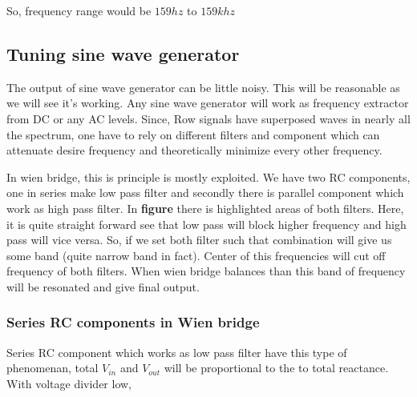 \documentclass[14pt,a4paper]{extarticle}
\begin{document}
So, frequency range would be \(159 hz\) to \(159k hz\)

\subsection{Tuning sine wave generator}
\label{sec:org46e8748}

The output of sine wave generator can be little noisy. This will be reasonable as we will see it's working. Any sine wave generator will work as frequency extractor from DC or any AC levels. Since, Row signals have superposed waves in nearly all the spectrum, one have to rely on different filters and component which can attenuate desire frequency and theoretically minimize every other frequency. 


In wien bridge, this is principle is mostly exploited. We have two RC components, one in series make low pass filter and secondly there is parallel component which work as high pass filter. In \textbf{\textbf{figure}} there is highlighted areas of both filters. Here, it is quite straight forward see that low pass will block higher frequency and high pass will vice versa. So, if we set both filter such that combination will give us some band (quite narrow band in fact). Center of this frequencies will cut off frequency of both filters. When wien bridge balances than this band of frequency will be resonated and give final output.

\subsubsection{Series RC components in Wien bridge}
\label{sec:orgd318951}
Series RC component which works as low pass filter have this type of phenomenan, total \(V_{in}\) and \(V_{out}\) will be proportional to the to total reactance. With voltage divider low, 
\end{document}
